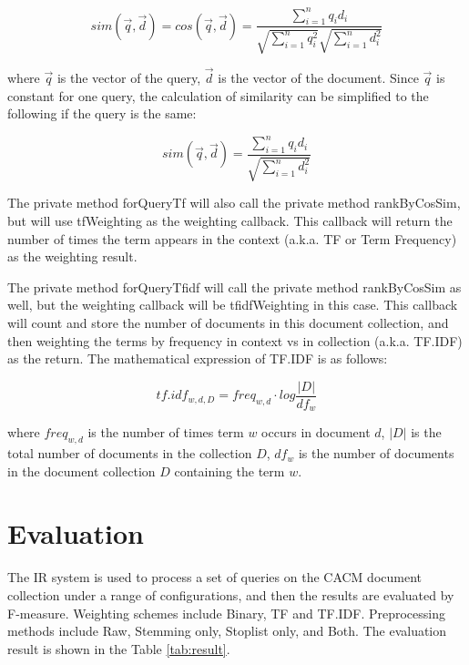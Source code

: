 \documentclass[11pt,a4paper]{article}
\begin{document}
\begin{equation}
    sim(\vec{q},\vec{d})=cos(\vec{q},\vec{d})=\frac{\sum_{i=1}^{n}q_id_i}{\sqrt{\sum_{i=1}^{n}q_i^2}\sqrt{\sum_{i=1}^{n}d_i^2}}
\end{equation}

where $\vec{q}$ is the vector of the query, $\vec{d}$ is the vector of the document. Since $\vec{q}$ is constant for one query, the calculation of similarity can be simplified to the following if the query is the same:

\begin{equation}
    sim(\vec{q},\vec{d})=\frac{\sum_{i=1}^{n}q_id_i}{\sqrt{\sum_{i=1}^{n}d_i^2}}
\end{equation}

The private method forQueryTf will also call the private method rankByCosSim, but will use tfWeighting as the weighting callback. This callback will return the number of times the term appears in the context (a.k.a. TF or Term Frequency) as the weighting result.

The private method forQueryTfidf will call the private method rankByCosSim as well, but the weighting callback will be tfidfWeighting in this case. This callback will count and store the number of documents in this document collection, and then weighting the terms by frequency in context vs in collection (a.k.a. TF.IDF) as the return. The mathematical expression of TF.IDF is as follows:

\begin{equation}
    tf.idf_{w,d,D} = freq_{w,d}\cdot log\frac{|D|}{df_{w}}
\end{equation}

where $freq_{w,d}$ is the number of times term $w$ occurs in document $d$, $|D|$ is the total number of documents in the collection $D$, $df_{w}$ is the number of documents in the document collection $D$ containing the term $w$.

\section*{\Large Evaluation}

The IR system is used to process a set of queries on the CACM document collection under a range of configurations, and then the results are evaluated by F-measure. Weighting schemes include Binary, TF and TF.IDF. Preprocessing methods include Raw, Stemming only, Stoplist only, and Both. The evaluation result is shown in the Table \ref{tab:result}.
\end{document}
